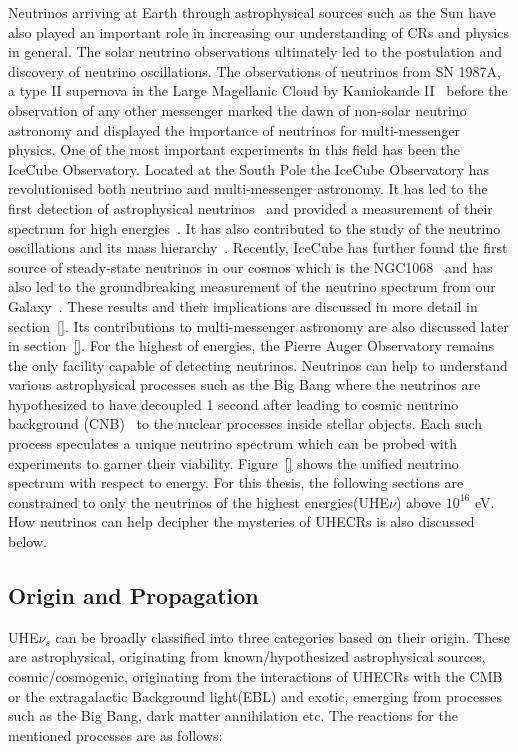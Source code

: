 Neutrinos arriving at Earth through astrophysical sources such as the Sun have also played an important role in increasing our understanding of CRs and physics in general. The solar neutrino observations ultimately led to the postulation and discovery of neutrino oscillations. The observations of neutrinos from SN 1987A, a type II supernova in the Large Magellanic Cloud by Kamiokande II~\cite{} before the observation of any other messenger marked the dawn of non-solar neutrino astronomy and displayed the importance of neutrinos for multi-messenger physics. One of the most important experiments in this field has been the IceCube Observatory. Located at the South Pole the IceCube Observatory has revolutionised both neutrino and multi-messenger astronomy. It has led to the first detection of astrophysical neutrinos~\cite{} and provided a measurement of their spectrum for high energies~\cite{}. It has also contributed to the study of the neutrino oscillations\cite{} and its mass hierarchy~\cite{}. Recently, IceCube has further found the first source of steady-state neutrinos in our cosmos which is the NGC1068~\cite{} and has also led to the groundbreaking measurement of the neutrino spectrum from our Galaxy~\cite{}. These results and their implications are discussed in more detail in section~\ref{}. Its contributions to multi-messenger astronomy are also discussed later in section~\ref{}. For the highest of energies, the Pierre Auger Observatory remains the only facility capable of detecting neutrinos. 
Neutrinos can help to understand various astrophysical processes such as the Big Bang where the neutrinos are hypothesized to have decoupled 1 second after leading to cosmic neutrino background (CNB)~\cite{} to the nuclear processes inside stellar objects. Each such process speculates a unique neutrino spectrum which can be probed with experiments to garner their viability. Figure~\ref{} shows the unified neutrino spectrum with respect to energy. For this thesis, the following sections are constrained to only the neutrinos of the highest energies(UHE$\nu$) above $10^16$ eV. How neutrinos can help decipher the mysteries of UHECRs is also discussed below.


\subsection{Origin and Propagation}
\label{subsec:nuorig}
UHE$\nu_s$ can be broadly classified into three categories based on their origin. These are astrophysical, originating from known/hypothesized astrophysical sources, cosmic/cosmogenic, originating from the interactions of UHECRs with the CMB or the extragalactic Background light(EBL) and exotic, emerging from processes such as the Big Bang, dark matter annihilation etc. The reactions for the mentioned processes are as follows:



